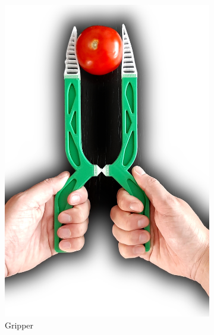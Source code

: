 \begin{figure}
	\centering
	\begin{subfigure}[B]{.33\columnwidth}
		\centering
		\includegraphics[width=\columnwidth]{sources/applications/gripper.jpg}
		\caption{Gripper}
	\end{subfigure}
	\begin{subfigure}[B]{.33\columnwidth}
		\centering

\end{subfigure}
\end{figure}
